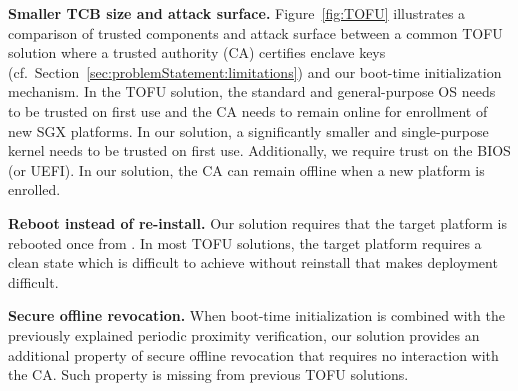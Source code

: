 \begin{mylist}
\item \textbf{Smaller TCB size and attack surface.} Figure~\ref{fig:TOFU} illustrates a comparison of trusted components and attack surface between a common TOFU solution where a trusted authority (CA) certifies enclave keys (cf.~Section~\ref{sec:problemStatement:limitations}) and our boot-time initialization mechanism. In the TOFU solution, the standard and general-purpose OS needs to be trusted on first use and the CA needs to remain online for enrollment of new SGX platforms. In our solution, a significantly smaller and single-purpose kernel needs to be trusted on first use. Additionally, we require trust on the BIOS (or UEFI). In our solution, the CA can remain offline when a new platform is enrolled.


\item \textbf{Reboot instead of re-install.} Our solution requires that the target platform is rebooted once from \device. In most TOFU solutions, the target platform requires a clean state which is difficult to achieve without reinstall that makes deployment difficult.


\item \textbf{Secure offline revocation.} When boot-time initialization is combined with the previously explained periodic proximity verification, our solution provides an additional property of secure offline revocation that requires no interaction with the CA. Such property is missing from previous TOFU solutions.

\end{mylist}

